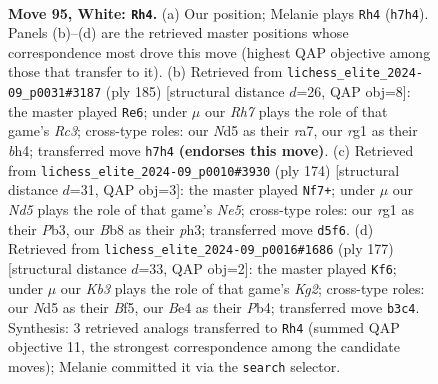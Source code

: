 \documentclass[11pt]{article}
\begin{document}
\clearpage

\begin{figure}[p]\centering
\begin{subfigure}{0.46\textwidth}\centering
\resizebox{\linewidth}{!}{%
\newchessgame
\chessboard[
  setfen={1B3k2/7R/1P6/3N4/P3B1b1/1K5p/8/6r1 w - - 11 95},
  showmover=false,
  pgfstyle=straightmove, color=movearrow, markmove={h7-h4}
]}
\caption{}
\end{subfigure}\hfill
\begin{subfigure}{0.46\textwidth}\centering
\resizebox{\linewidth}{!}{%
\newchessgame
\chessboard[
  setfen={5k2/R7/2r5/2P4p/7B/3K1bP1/8/8 b - - 2 93},
  showmover=false,
  pgfstyle=straightmove, color=movearrow, markmove={c6-e6}
]}
\caption{}
\end{subfigure}
\\[4pt]
\begin{subfigure}{0.46\textwidth}\centering
\resizebox{\linewidth}{!}{%
\newchessgame
\chessboard[
  setfen={b7/8/5B1k/4N1R1/5n2/KP5p/7P/8 w - - 0 88},
  showmover=false,
  pgfstyle=straightmove, color=movearrow, markmove={e5-f7}
]}
\caption{}
\end{subfigure}\hfill
\begin{subfigure}{0.46\textwidth}\centering
\resizebox{\linewidth}{!}{%
\newchessgame
\chessboard[
  setfen={8/6kp/2B5/2p2b2/1pP2P2/r7/3K4/8 b - - 5 89},
  showmover=false,
  pgfstyle=straightmove, color=movearrow, markmove={g7-f6}
]}
\caption{}
\end{subfigure}
\caption{\textbf{Move 95, White: \texttt{Rh4}.} (a) Our position; Melanie plays \texttt{Rh4} (\texttt{h7h4}). Panels (b)--(d) are the retrieved master positions whose correspondence most drove this move (highest QAP objective among those that transfer to it). (b) Retrieved from \texttt{lichess\_elite\_2024-09\_p0031\#3187} (ply 185) [structural distance $d$=26, QAP obj=8]: the master played \texttt{Re6}; under $\mu$ our \emph{Rh7} plays the role of that game's \emph{Rc3}; cross-type roles: our \emph{N}d5 as their \emph{r}a7, our \emph{r}g1 as their \emph{b}h4; transferred move \texttt{h7h4} \textbf{(endorses this move)}. (c) Retrieved from \texttt{lichess\_elite\_2024-09\_p0010\#3930} (ply 174) [structural distance $d$=31, QAP obj=3]: the master played \texttt{Nf7+}; under $\mu$ our \emph{Nd5} plays the role of that game's \emph{Ne5}; cross-type roles: our \emph{r}g1 as their \emph{P}b3, our \emph{B}b8 as their \emph{p}h3; transferred move \texttt{d5f6}. (d) Retrieved from \texttt{lichess\_elite\_2024-09\_p0016\#1686} (ply 177) [structural distance $d$=33, QAP obj=2]: the master played \texttt{Kf6}; under $\mu$ our \emph{Kb3} plays the role of that game's \emph{Kg2}; cross-type roles: our \emph{N}d5 as their \emph{B}f5, our \emph{B}e4 as their \emph{P}b4; transferred move \texttt{b3c4}. Synthesis: 3 retrieved analogs transferred to \texttt{Rh4} (summed QAP objective 11, the strongest correspondence among the candidate moves); Melanie committed it via the \texttt{search} selector.}
\label{fig:thought-m188}
\end{figure}
\end{document}
